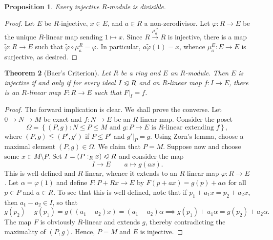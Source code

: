 \documentclass[10pt]{article}
\theoremstyle{thmstyle}
\newtheorem{theorem}{Theorem}[section]
\newtheorem{proposition}[theorem]{Proposition}
\theoremstyle{defstyle}
\newcommand{\wt}[1]{\widetilde{#1}}
\renewcommand{\le}{\leqslant}
\newcommand{\noreq}{\trianglelefteqslant}
\begin{document}
\begin{proposition}
    Every injective $R$-module is divisible. 
\end{proposition}
\begin{proof}
    Let $E$ be $R$-injective, $x\in E$, and $a\in R$ a non-zerodivisor. Let $\varphi: R\to E$ be the unique $R$-linear map sending $1\mapsto x$. Since $R\xrightarrow{\mu_a^R} R$ is injective, there is a map $\wt\varphi: R\to E$ such that $\wt\varphi\circ\mu_a^R = \varphi$. In particular, $a\wt\varphi(1) = x$, whence $\mu_a^E: E\to E$ is surjective, as desired.
\end{proof}

\begin{theorem}[Baer's Criterion]
    Let $R$ be a ring and $E$ an $R$-module. Then $E$ is injective if and only if for every ideal $I\noreq R$ and an $R$-linear map $f: I\to E$, there is an $R$-linear map $F: R\to E$ such that $F|_I = f$.
\end{theorem}
\begin{proof}
    The forward implication is clear. We shall prove the converse. Let $0\to N\to M$ be exact and $f: N\to E$ be an $R$-linear map. Consider the poset 
    \begin{equation*}
        \Omega = \left\{(P, g)\colon N\le P\le M\text{ and }g: P\to E\text{ is $R$-linear extending $f$}\right\},
    \end{equation*}
    where $(P, g)\leqq(P', g')$ if $P\le P'$ and $g'|_P = g$.
    Using Zorn's lemma, choose a maximal element $(P, g)\in\Omega$. We claim that $P = M$. Suppose now and choose some $x\in M\setminus P$. Set $I = (P :_R x)\noreq R$ and consider the map 
    \begin{equation*}
        I\longrightarrow E\qquad a\mapsto g(ax).
    \end{equation*}
    This is well-defined and $R$-linear, whence it extends to an $R$-linear map $\varphi: R\to E$. Let $\alpha = \varphi(1)$ and define $F: P + Rx \to E$ by $F(p + ax) = g(p) + a\alpha$ for all $p\in P$ and $a\in R$. To see that this is well-defined, note that if $p_1 + a_1 x = p_2 + a_2 x$, then $a_1 - a_2\in I$, so that 
    \begin{equation*}
        g(p_2) - g(p_1) = g((a_1 - a_2)x) = (a_1 - a_2)\alpha\implies g(p_1) + a_1\alpha = g(p_2) + a_2\alpha.
    \end{equation*}
    The map $F$ is obviously $R$-linear and extends $g$, thereby contradicting the maximality of $(P, g)$. Hence, $P = M$ and $E$ is injective.
\end{proof}
\end{document}
